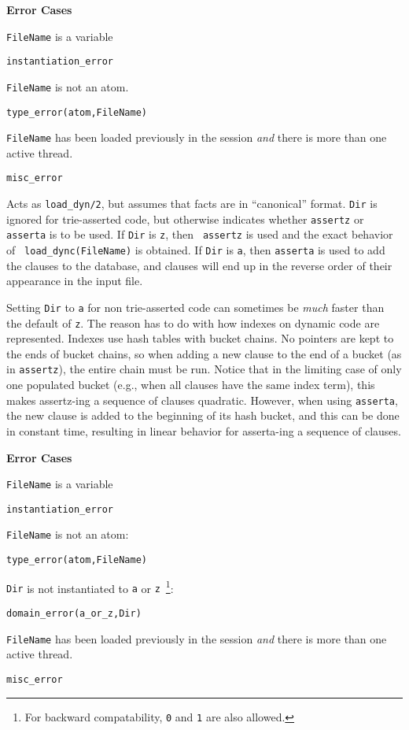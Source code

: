 \begin{description}
{\bf Error Cases}
\bi
\item 	{\tt FileName} is a variable
\bi
\item 	{\tt instantiation\_error}
\ei
\item 	{\tt FileName} is not an atom.
\bi
\item 	{\tt type\_error(atom,FileName)}
\ei
%
\item {\tt FileName} has been loaded previously in the session {\em and}
  there is more than one active thread.  
\bi
\item 	{\tt misc\_error}
\ei
\ei

\label{load_dync/2}
    Acts as {\tt load\_dyn/2}, but assumes that facts are in
    ``canonical'' format.  {\tt Dir} is ignored for trie-asserted
    code, but otherwise indicates whether {\tt assertz} or {\tt
    asserta} is to be used.  If {\tt Dir} is {\tt z}, then {\tt
    assertz} is used and the exact behavior of {\tt
    load\_dync(FileName)} is obtained.  If {\tt Dir} is {\tt a}, then
    {\tt asserta} is used to add the clauses to the database, and
    clauses will end up in the reverse order of their appearance in
    the input file.  

    Setting {\tt Dir} to {\tt a} for non trie-asserted code can
    sometimes be {\em much} faster than the default of {\tt z}.  The
    reason has to do with how indexes on dynamic code are represented.
    Indexes use hash tables with bucket chains.  No pointers are kept
    to the ends of bucket chains, so when adding a new clause to the
    end of a bucket (as in {\tt assertz}), the entire chain must be
    run.  Notice that in the limiting case of only one populated
    bucket (e.g., when all clauses have the same index term), this
    makes assertz-ing a sequence of clauses quadratic.  However, when
    using {\tt asserta}, the new clause is added to the beginning of
    its hash bucket, and this can be done in constant time, resulting
    in linear behavior for asserta-ing a sequence of clauses.

{\bf Error Cases}
\bi
\item 	{\tt FileName} is a variable
\bi
\item 	{\tt instantiation\_error}
\ei
\item 	{\tt FileName} is not an atom:
\bi
\item 	{\tt type\_error(atom,FileName)}
\ei
%
\item 	{\tt Dir} is not instantiated to {\tt a} or {\tt z}~\footnote{For
backward compatability, {\tt 0} and {\tt 1} are also allowed.}: 
\bi
\item 	{\tt domain\_error(a\_or\_z,Dir)}
\ei
%
\item {\tt FileName} has been loaded previously in the session {\em and}
  there is more than one active thread.  
\bi
\item 	{\tt misc\_error}
\ei
\ei


\end{description}
